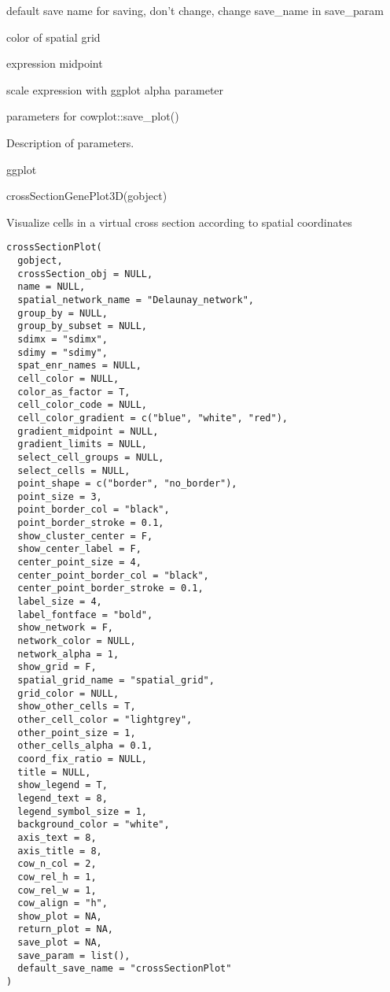 \documentclass[a4paper]{book}
\begin{document}
\begin{Arguments}
\begin{ldescription}
\item[\code{default\_save\_name}] default save name for saving, don't change, change save\_name in save\_param

\item[\code{grid\_color}] color of spatial grid

\item[\code{midpoint}] expression midpoint

\item[\code{scale\_alpha\_with\_expression}] scale expression with ggplot alpha parameter

\item[\code{...}] parameters for cowplot::save\_plot()
\end{ldescription}
\end{Arguments}
%
\begin{Details}\relax
Description of parameters.
\end{Details}
%
\begin{Value}
ggplot
\end{Value}
%
\begin{Examples}
\begin{ExampleCode}
    crossSectionGenePlot3D(gobject)

\end{ExampleCode}
\end{Examples}
%
\begin{Description}\relax
Visualize cells in a virtual cross section according to spatial coordinates
\end{Description}
%
\begin{Usage}
\begin{verbatim}
crossSectionPlot(
  gobject,
  crossSection_obj = NULL,
  name = NULL,
  spatial_network_name = "Delaunay_network",
  group_by = NULL,
  group_by_subset = NULL,
  sdimx = "sdimx",
  sdimy = "sdimy",
  spat_enr_names = NULL,
  cell_color = NULL,
  color_as_factor = T,
  cell_color_code = NULL,
  cell_color_gradient = c("blue", "white", "red"),
  gradient_midpoint = NULL,
  gradient_limits = NULL,
  select_cell_groups = NULL,
  select_cells = NULL,
  point_shape = c("border", "no_border"),
  point_size = 3,
  point_border_col = "black",
  point_border_stroke = 0.1,
  show_cluster_center = F,
  show_center_label = F,
  center_point_size = 4,
  center_point_border_col = "black",
  center_point_border_stroke = 0.1,
  label_size = 4,
  label_fontface = "bold",
  show_network = F,
  network_color = NULL,
  network_alpha = 1,
  show_grid = F,
  spatial_grid_name = "spatial_grid",
  grid_color = NULL,
  show_other_cells = T,
  other_cell_color = "lightgrey",
  other_point_size = 1,
  other_cells_alpha = 0.1,
  coord_fix_ratio = NULL,
  title = NULL,
  show_legend = T,
  legend_text = 8,
  legend_symbol_size = 1,
  background_color = "white",
  axis_text = 8,
  axis_title = 8,
  cow_n_col = 2,
  cow_rel_h = 1,
  cow_rel_w = 1,
  cow_align = "h",
  show_plot = NA,
  return_plot = NA,
  save_plot = NA,
  save_param = list(),
  default_save_name = "crossSectionPlot"
)
\end{verbatim}
\end{Usage}
\end{document}
